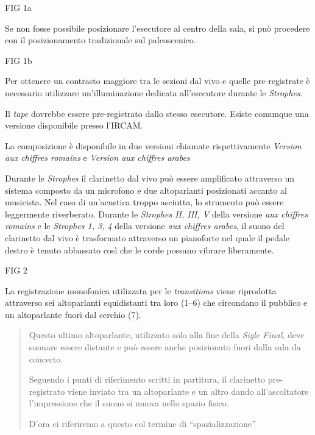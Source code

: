 FIG 1a

Se non fosse possibile posizionare l'esecutore al centro della sala, si può procedere con il posizionamento tradizionale sul palcoscenico.

FIG 1b

Per ottenere un contrasto maggiore tra le sezioni dal vivo e quelle pre-registrate è necessario utilizzare un'illuminazione dedicata all'esecutore durante le \emph{Strophes}.

Il \emph{tape} dovrebbe essere pre-registrato dallo stesso esecutore. Esiste comunque una versione disponibile presso l'IRCAM.

La composizione è disponibile in due versioni chiamate rispettivamente \emph{Version aux chiffres romains} e \emph{Version aux chiffres arabes}


Durante le \emph{Strophes} il clarinetto dal vivo può essere amplificato attraverso un sistema composto da un microfono e due altoparlanti posizionati accanto al musicista. Nel caso di un'acustica troppo asciutta, lo strumento può essere leggermente riverberato. Durante le \emph{Strophes II, III, V} della versione \emph{aux chiffres romains} e le \emph{Strophes 1, 3, 4} della versione \emph{aux chiffres arabes}, il suono del clarinetto dal vivo è trasformato attraverso un pianoforte nel quale il pedale destro è tenuto abbassato così che le corde possano vibrare liberamente. 

FIG 2


La registrazione monofonica utilizzata per le \emph{transitions} viene riprodotta attraverso sei altoparlanti equidistanti tra loro (1--6) che circondano il pubblico e un altoparlante fuori dal cerchio (7).

\begin{quote}
{\small
Questo ultimo altoparlante, utilizzato solo alla fine della \emph{Sigle Final}, deve suonare essere distante e può essere anche posizionato fuori dalla sala da concerto.


Seguendo i punti di riferimento scritti in partitura, il clarinetto pre-registrato viene inviato tra un altoparlante e un altro dando all'ascoltatore l'impressione che il suono si muova nello spazio fisico. 

D'ora ci riferiremo a questo col termine di “spazializzazione”
}

\end{quote}

